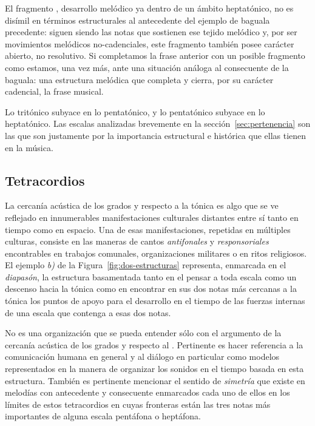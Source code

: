 \documentclass[a4paper,12pt]{article}
\begin{document}
\begin{multicols}{2}
  El fragmento , desarrollo melódico ya dentro de un ámbito heptatónico, no es disímil en términos estructurales al antecedente del ejemplo de baguala precedente:  siguen siendo las notas que sostienen ese tejido melódico y, por ser movimientos melódicos no-cadenciales, este fragmento también posee carácter abierto, no resolutivo. Si completamos la frase anterior con un posible fragmento como  estamos, una vez más, ante una situación análoga al consecuente de la baguala: una estructura melódica  que completa y cierra, por su carácter cadencial, la frase musical.

  Lo tritónico subyace en lo pentatónico, y lo pentatónico subyace en lo heptatónico. Las escalas analizadas brevemente en la sección~\ref{sec:pertenencia} son las que son justamente por la importancia estructural e histórica que ellas tienen en la música.

  \subsection{Tetracordios}\label{subsec:tetracordios}

  La cercanía acústica de los grados  y  respecto a la tónica  es algo que se ve reflejado en innumerables manifestaciones culturales distantes entre sí tanto en tiempo como en espacio. Una de esas manifestaciones, repetidas en múltiples culturas, consiste en las maneras de cantos \emph{antifonales} y \emph{responsoriales} encontrables en trabajos comunales, organizaciones militares o en ritos religiosos. El ejemplo \emph{b)} de la Figura~\ref{fig:dos-estructuras} representa, enmarcada en el \emph{diapasón}, la estructura basamentada tanto en el pensar a toda escala como un descenso hacia la tónica como en encontrar en sus dos notas más cercanas a la tónica los puntos de apoyo para el desarrollo en el tiempo de las fuerzas internas de una escala que contenga a esas dos notas.

  No es  una organización que se pueda entender sólo con el argumento de la cercanía acústica de los grados  y  respecto al . Pertinente es hacer referencia a la comunicación humana en general y al diálogo en particular como modelos representados en la manera de organizar los sonidos en el tiempo basada en esta estructura. También es pertinente mencionar el sentido de \emph{simetría} que existe en melodías con antecedente y consecuente enmarcados cada uno de ellos en los límites de estos tetracordios en cuyas fronteras están las tres notas más importantes de alguna escala pentáfona o heptáfona.


\end{multicols}
\end{document}
